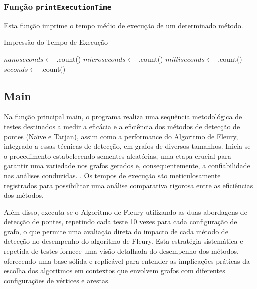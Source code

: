 \documentclass[12pt]{article}
\begin{document}
\subsubsection{Função \texttt{printExecutionTime}}

Esta função imprime o tempo médio de execução de um determinado método.

\begin{algorithm}[H]
\caption{Impressão do Tempo de Execução}
\begin{algorithmic}[1]
    \State $nanoseconds \gets$ .count()
    \State $microseconds \gets$ .count()
    \State $milliseconds \gets$ .count()
    \State $seconds \gets$ .count()
    \State {}
\EndFunction
\end{algorithmic}
\end{algorithm}

\subsection{Main}
Na função principal main, o programa realiza uma sequência metodológica de testes destinados a medir a eficácia e a eficiência dos métodos de detecção de pontes (Naïve e Tarjan), assim como a performance do Algoritmo de Fleury, integrado a essas técnicas de detecção, em grafos de diversos tamanhos. Inicia-se o procedimento estabelecendo sementes aleatórias, uma etapa crucial para garantir uma variedade nos grafos gerados e, consequentemente, a confiabilidade nas análises conduzidas. . Os tempos de execução são meticulosamente registrados para possibilitar uma análise comparativa rigorosa entre as eficiências dos métodos.

Além disso, executa-se o Algoritmo de Fleury utilizando as duas abordagens de detecção de pontes, repetindo cada teste 10 vezes para cada configuração de grafo, o que permite uma avaliação direta do impacto de cada método de detecção no desempenho do algoritmo de Fleury. Esta estratégia sistemática e repetida de testes fornece uma visão detalhada do desempenho dos métodos, oferecendo uma base sólida e replicável para entender as implicações práticas da escolha dos algoritmos em contextos que envolvem grafos com diferentes configurações de vértices e arestas.
\end{document}
